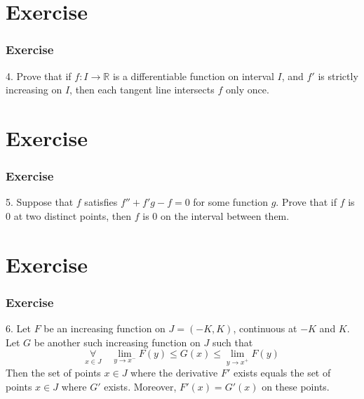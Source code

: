 \documentclass[12pt, t]{beamer}
\begin{document}
\section{Exercise}
\begin{frame}
    \frametitle{Exercise}
    4. Prove that if $f:I\rightarrow\mathbb{R}$ is a differentiable function on interval $I$, and $f'$ is strictly increasing on $I$,
    then each tangent line intersects $f$ only once.

\end{frame}

\section{Exercise}
\begin{frame}
    \frametitle{Exercise}
    5. Suppose that $f$ satisfies $f''+f'g-f=0$ for some function $g$. Prove that if $f$ is 0 at two distinct points,
    then $f$ is 0 on the interval between them.

\end{frame}

\section{Exercise}
\begin{frame}
    \frametitle{Exercise}
    6. Let $F$ be an increasing function on $J=(-K,K)$, continuous at $-K$ and $K$. Let $G$ be another such increasing function on $J$ such that
    \begin{equation*}
        \underset{x\in J}{\forall}\quad \underset{y\rightarrow x^-}{\lim}F(y)\leq G(x) \leq \underset{y\rightarrow x^+}{\lim}F(y)
    \end{equation*}
    Then the set of points $x\in J$ where the derivative $F'$ exists equals the set of points $x\in J$ where $G'$ exists. Moreover,
    $F'(x)=G'(x)$ on these points.


\end{frame}
\end{document}
